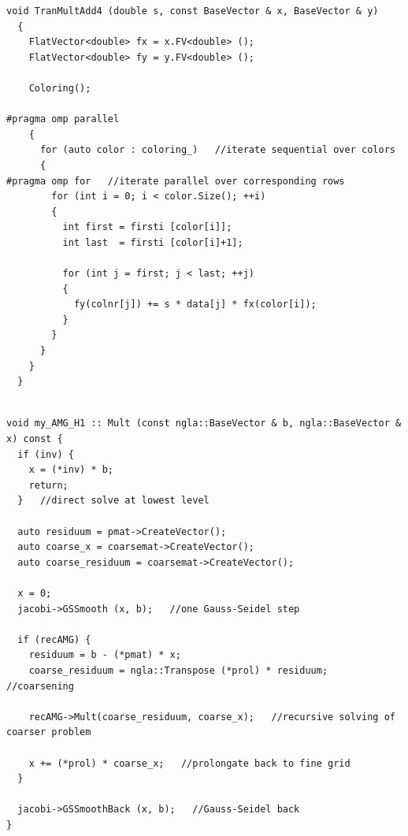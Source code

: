 \documentclass[a4paper,11pt]{scrartcl}
\begin{document}
\begin{lstlisting}
void TranMultAdd4 (double s, const BaseVector & x, BaseVector & y)
  {
    FlatVector<double> fx = x.FV<double> ();
    FlatVector<double> fy = y.FV<double> ();

    Coloring();

#pragma omp parallel
    {
      for (auto color : coloring_)   //iterate sequential over colors
      {
#pragma omp for   //iterate parallel over corresponding rows
        for (int i = 0; i < color.Size(); ++i)
        {
          int first = firsti [color[i]];
          int last  = firsti [color[i]+1];

          for (int j = first; j < last; ++j)
          {
            fy(colnr[j]) += s * data[j] * fx(color[i]);
          }
        }
      }
    }
  }


\end{lstlisting}

\begin{lstlisting}
void my_AMG_H1 :: Mult (const ngla::BaseVector & b, ngla::BaseVector & x) const {
  if (inv) {
    x = (*inv) * b;
    return;
  }   //direct solve at lowest level

  auto residuum = pmat->CreateVector();
  auto coarse_x = coarsemat->CreateVector();
  auto coarse_residuum = coarsemat->CreateVector();

  x = 0;
  jacobi->GSSmooth (x, b);   //one Gauss-Seidel step

  if (recAMG) {
    residuum = b - (*pmat) * x;
    coarse_residuum = ngla::Transpose (*prol) * residuum;   //coarsening

    recAMG->Mult(coarse_residuum, coarse_x);   //recursive solving of coarser problem

    x += (*prol) * coarse_x;   //prolongate back to fine grid
  }

  jacobi->GSSmoothBack (x, b);   //Gauss-Seidel back
}
\end{lstlisting}
\end{document}
